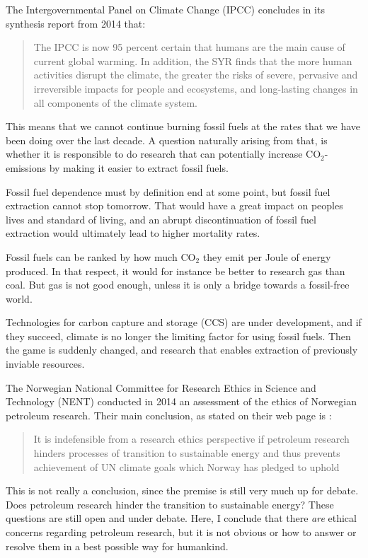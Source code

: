 The Intergovernmental Panel on Climate Change (IPCC) concludes in its synthesis report from 2014 \cite{IPCC2014} that:

\begin{quotation}
The IPCC is now 95 percent certain that humans are the main cause of current global warming. In addition, the SYR finds that the more human activities disrupt the climate, the greater the risks of severe, pervasive and irreversible impacts for people and ecosystems, and long-lasting changes in all components of the climate system. 
\end{quotation}
This means that we cannot continue burning fossil fuels at the rates that we have been doing over the last decade. A question naturally arising from that, is whether it is responsible to do research that can potentially increase CO$_2$-emissions by making it easier to extract fossil fuels.

Fossil fuel dependence must by definition end at some point, but fossil fuel extraction cannot stop tomorrow. That would have a great impact on peoples lives and standard of living, and an abrupt discontinuation of fossil fuel extraction would ultimately lead to higher mortality rates.

Fossil fuels can be ranked by how much CO$_2$ they emit per Joule of energy produced. In that respect, it would for instance be better to research gas than coal. But gas is not good enough, unless it is only a bridge towards a fossil-free world.

Technologies for carbon capture and storage (CCS) are under development, and if they succeed, climate is no longer the limiting factor for using fossil fuels. Then the game is suddenly changed, and research that enables extraction of previously inviable resources.

The Norwegian National Committee for Research Ethics in Science and Technology (NENT) conducted in 2014 an assessment of the ethics of Norwegian petroleum research. Their main conclusion, as stated on their web page is \cite{NENT2014}:

\begin{quotation}
It is indefensible from a research ethics perspective if petroleum research hinders processes of transition to sustainable energy and thus prevents achievement of UN climate goals which Norway has pledged to uphold
\end{quotation}
This is not really a conclusion, since the premise is still very much up for debate. Does petroleum research hinder the transition to sustainable energy? These questions are still open and under debate. 
Here, I conclude that there \emph{are} ethical concerns regarding petroleum research, but it is not obvious or how to answer or resolve them in a best possible way for humankind.

